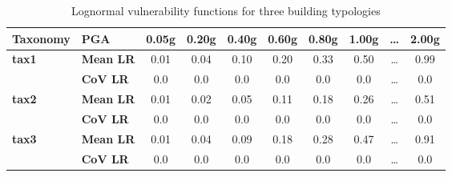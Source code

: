 \begin{table}[htbp]

\centering
\begin{tabular}{ l l c c c c c c c c }

\hline
\rowcolor{anti-flashwhite}
\bf{Taxonomy} & \bf{PGA} & \bf{0.05g} & \bf{0.20g} & \bf{0.40g} & \bf{0.60g} & \bf{0.80g} & \bf{1.00g} & \bf{\dots} & \bf{2.00g} \\
\hline
\bf{tax1} & \bf{Mean LR} & 0.01 & 0.04 & 0.10 & 0.20 & 0.33 & 0.50 & \dots & 0.99 \\
    & \bf{CoV LR} & 0.0 & 0.0 & 0.0 & 0.0 & 0.0 & 0.0 & \dots & 0.0 \\
\hline
\bf{tax2} & \bf{Mean LR} & 0.01	& 0.02 & 0.05 & 0.11 & 0.18 & 0.26 & \dots & 0.51 \\
    & \bf{CoV LR} & 0.0 & 0.0 & 0.0 & 0.0 & 0.0 & 0.0 & \dots & 0.0 \\
\hline
\bf{tax3} & \bf{Mean LR} & 0.01 & 0.04 & 0.09 & 0.18 & 0.28 & 0.47 & \dots & 0.91 \\
    & \bf{CoV LR} & 0.0 & 0.0 & 0.0 & 0.0 & 0.0 & 0.0 & \dots & 0.0 \\
\hline
\end{tabular}

\caption{Lognormal vulnerability functions for three building typologies}
\label{tab:vf-ln-tax3-zcov}
\end{table}